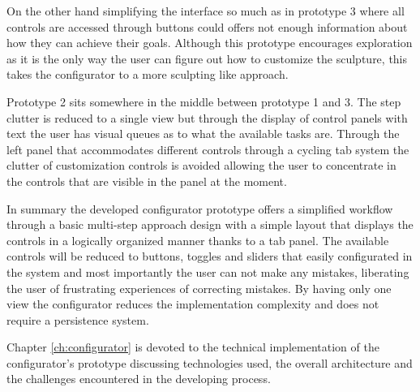 \documentclass[../medieninformatik-arbeit.tex]{subfiles}
\begin{document}
On the other hand simplifying the interface so much as in prototype 3 where all controls are accessed through buttons could offers not enough information about how they can achieve their goals. Although this prototype encourages exploration as it is the only way the user can figure out how to customize the sculpture, this takes the configurator to a more sculpting like approach. 

Prototype 2 sits somewhere in the middle between prototype 1 and 3. The step clutter is reduced to a single view but through the display of control panels with text the user has visual queues as to what the available tasks are. Through the left panel that accommodates different controls through a cycling tab system the clutter of customization controls is avoided allowing the user to concentrate in the controls that are visible in the panel at the moment. 

In summary the developed configurator prototype offers a simplified workflow through a basic multi-step approach design with a simple layout that displays the controls in a logically organized manner thanks to a tab panel. The available controls will be reduced to buttons, toggles and sliders that easily configurated in the system and most importantly the user can not make any mistakes, liberating the user of frustrating experiences of correcting mistakes. By having only one view the configurator reduces the implementation complexity and does not require a persistence system.

Chapter \ref{ch:configurator} is devoted to the technical implementation of the configurator's prototype discussing technologies used, the overall architecture and the challenges encountered in the developing process. 
\end{document}
